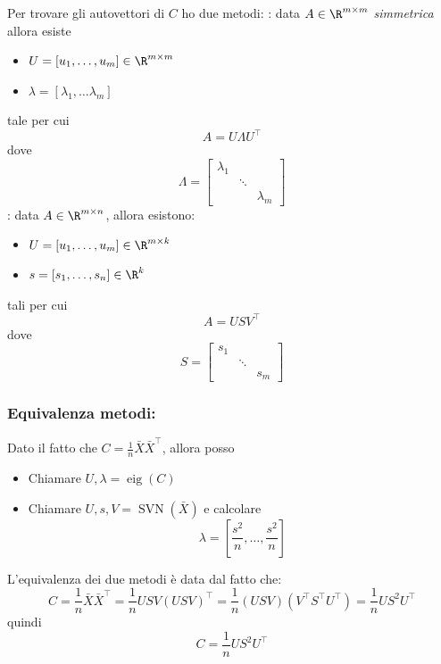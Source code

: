 Per trovare gli autovettori di $ C $ ho due metodi:
\vskip3mm
: data $ A \in \R^{m \times m} $ \textit{simmetrica} allora esiste
\begin{itemize}
	\item $ U = \left[u_1, \ldots , u_m\right] \in \R^{m \times m}$
	\item $ \lambda  = \left[\lambda_1, \ldots \lambda_m\right] $
\end{itemize}
tale per cui
\[
	A = U \Lambda U^\top
\]
dove
\[
	\Lambda = \begin{bmatrix}
		\lambda_1 &        &           \\
		          & \ddots &           \\
		          &        & \lambda_m
	\end{bmatrix}
\]
\vskip3mm
: data $ A \in \R^{m \times n} $, allora esistono:
\begin{itemize}
	\item $ U  = \left[u_1, \ldots , u_m\right]\in  \R^{m \times k} $
	\item $ s = \left[s_1, \ldots , s_n\right] \in \R^{k} $
\end{itemize}
tali per cui
\[
	A = USV^{\top}
\]
dove
\[
	S = \begin{bmatrix}
		s_1 &        &     \\
		    & \ddots &     \\
		    &        & s_m
	\end{bmatrix}
\]

\subsubsection{Equivalenza metodi:}
Dato il fatto che $ C = \frac{1}{n} \bar{X}\bar{X}^{\top} $, allora posso
\begin{itemize}
	\item Chiamare $ U, \lambda = \operatorname{eig}\left(C\right) $
	\item Chiamare $ U, s, V = \operatorname{SVN}\left(\bar{X}\right) $ e calcolare
	      \[
		      \lambda = \left[\frac{s^2}{n}, \ldots , \frac{s^2}{n}\right]
	      \]
\end{itemize}
L'equivalenza dei due metodi è data dal fatto che:
\[
	C = \frac{1}{n} \bar{X}\bar{X}^{\top} = \frac{1}{n} USV \left(USV\right)^{\top}= \frac{1}{n}\left(USV\right) \left(V^\top S^\top U^\top\right) = \frac{1}{n} U S^2 U^{\top}
\]
quindi
\[
	C =  \frac{1}{n} U S^2 U^{\top}
\]


